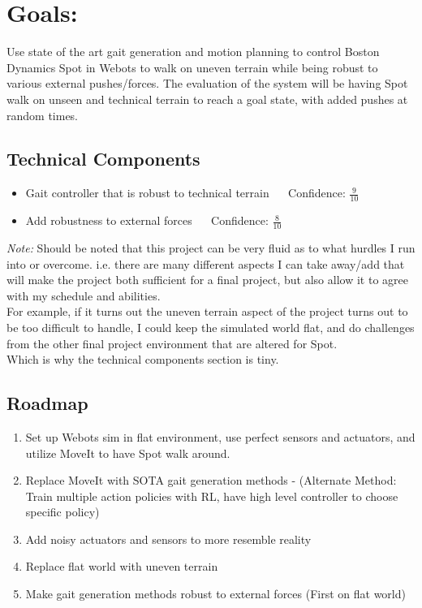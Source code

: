 \documentclass{article}
\theoremstyle{definition}
\theoremstyle{note}
\begin{document}
\section*{Goals:}
Use state of the art gait generation and motion planning to control Boston Dynamics Spot in Webots to 
walk on uneven terrain while being robust to various external pushes/forces. 
The evaluation of the system will be having Spot walk on unseen and technical terrain to reach a goal state, 
with added pushes at random times.


\subsection*{Technical Components}
\begin{itemize}
\item Gait controller that is robust to technical terrain $ \quad $ Confidence: $ \frac{9}{10} $ 
\item Add robustness to external forces $\quad$ Confidence: $ \frac{8}{10} $ 
\end{itemize}
\textit{Note:} Should be noted that this project can be very fluid as to what hurdles I run into or overcome. i.e. 
there are many different aspects I can take away/add that will make the project both sufficient for a final project, 
but also allow it to agree with my schedule and abilities.\\
For example, if it turns out the uneven terrain aspect of the project turns out to be too difficult to handle, I could
keep the simulated world flat, and do challenges from the other final project environment that are altered for Spot.
\\
Which is why the technical components section is tiny.

\subsection*{Roadmap}
\begin{enumerate}[label=\arabic*.), start=1] 
\item  Set up Webots sim in flat environment, use perfect sensors and actuators, and utilize MoveIt
to have Spot walk around.
\item Replace MoveIt with SOTA gait generation methods - (Alternate Method: Train multiple action policies with RL, have high level controller to choose specific policy)
\item Add noisy actuators and sensors to more resemble reality
\item Replace flat world with uneven terrain
\item Make gait generation methods robust to external forces (First on flat world)
\end{enumerate}
\end{document}
